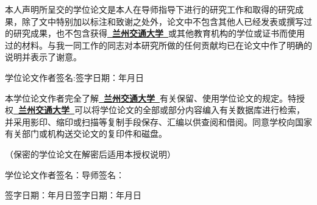 \newpage\thispagestyle{empty}

\vspace*{0\baselineskip}

\vspace{1\baselineskip}
本人声明所呈交的学位论文是本人在导师指导下进行的研究工作和取得的研究成果，除了文中特别加以标注和致谢之处外，论文中不包含其他人已经发表或撰写过的研究成果，也不包含获得\songti\textbf{\underline{\ 兰州交通大学\ }}或其他教育机构的学位或证书而使用过的材料。与我一同工作的同志对本研究所做的任何贡献均已在论文中作了明确的说明并表示了谢意。

\vspace{2\baselineskip}
\noindent 学位论文作者签名:\hspace{8em}签字日期：\qquad\quad 年\qquad 月\qquad 日

\vspace{6\baselineskip}

\vspace{1\baselineskip}	
本学位论文作者完全了解\songti\textbf{\underline{\ 兰州交通大学\ }}有关保留、使用学位论文的规定。特授权\songti\textbf{\underline{\ 兰州交通大学\ }}可以将学位论文的全部或部分内容编入有关数据库进行检索，并采用影印、缩印或扫描等复制手段保存、汇编以供查阅和借阅。同意学校向国家有关部门或机构送交论文的复印件和磁盘。

\noindent（保密的学位论文在解密后适用本授权说明）

\vspace{3\baselineskip}
\noindent 学位论文作者签名：\hspace{11em}导师签名：

\noindent 签字日期：\qquad\quad 年\qquad 月\qquad 日\hspace{5em}签字日期：\qquad\quad 年\qquad 月\qquad 日